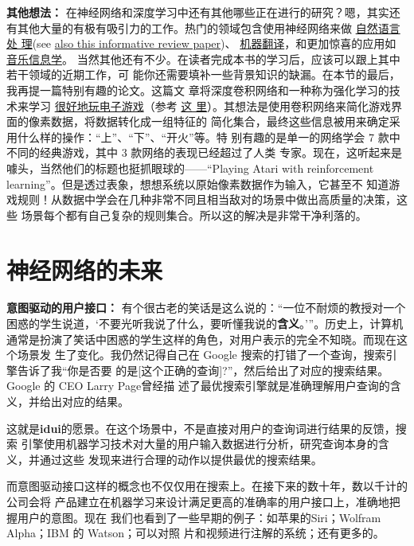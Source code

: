 \textbf{其他想法：} 在神经网络和深度学习中还有其他哪些正在进行的研究？嗯，其实还
有其他大量的有极有吸引力的工作。热门的领域包含使用神经网络来做%
\href{http://machinelearning.org/archive/icml2008/papers/391.pdf}{自然语言处
  理}(see \href{http://arxiv.org/abs/1103.0398}{also this informative review
  paper})、%
\href{http://papers.nips.cc/paper/5346-information-based-learning-by-agents-in-unbounded-state-spaces}{
  机器翻译}，和更加惊喜的应用如%
\href{http://yann.lecun.com/exdb/publis/pdf/humphrey-jiis-13.pdf}{音乐信息学}。
当然其他还有不少。在读者完成本书的学习后，应该可以跟上其中若干领域的近期工作，可
能你还需要填补一些背景知识的缺漏。在本节的最后，我再提一篇特别有趣的论文。这篇文
章将深度卷积网络和一种称为强化学习的技术来学习%
\href{http://www.cs.toronto.edu/~vmnih/docs/dqn.pdf}{很好地玩电子游戏}（参考
  \href{http://www.nature.com/nature/journal/v518/n7540/abs/nature14236.html}{这
    里}）。其想法是使用卷积网络来简化游戏界面的像素数据，将数据转化成一组特征的
简化集合，最终这些信息被用来确定采用什么样的操作：“上”、“下”、“开火”等。特
别有趣的是单一的网络学会 7 款中不同的经典游戏，其中 3 款网络的表现已经超过了人类
专家。现在，这听起来是噱头，当然他们的标题也挺抓眼球的——“Playing Atari with
reinforcement learning”。但是透过表象，想想系统以原始像素数据作为输入，它甚至不
知道游戏规则！从数据中学会在几种非常不同且相当敌对的场景中做出高质量的决策，这些
场景每个都有自己复杂的规则集合。所以这的解决是非常干净利落的。

\section{神经网络的未来}
\label{sec:on_the_future_of_neural_networks}

\textbf{意图驱动的用户接口：} 有个很古老的笑话是这么说的：“一位不耐烦的教授对一个
困惑的学生说道，‘不要光听我说了什么，要听懂我说的\textbf{含义}。’”。历史上，计算机
通常是扮演了笑话中困惑的学生这样的角色，对用户表示的完全不知晓。而现在这个场景发
生了变化。我仍然记得自己在 Google 搜索的打错了一个查询，搜索引擎告诉了我“你是否要
的是[这个正确的查询]?”，然后给出了对应的搜索结果。Google 的 CEO Larry Page曾经描
述了最优搜索引擎就是准确理解用户查询的含义，并给出对应的结果。

这就是\textbf{\gls{idui}}的愿景。在这个场景中，不是直接对用户的查询词进行结果的反馈，搜索
引擎使用机器学习技术对大量的用户输入数据进行分析，研究查询本身的含义，并通过这些
发现来进行合理的动作以提供最优的搜索结果。

而意图驱动接口这样的概念也不仅仅用在搜索上。在接下来的数十年，数以千计的公司会将
产品建立在机器学习来设计满足更高的准确率的用户接口上，准确地把握用户的意图。现在
我们也看到了一些早期的例子：如苹果的Siri；Wolfram Alpha；IBM 的 Watson；可以对照
片和视频进行注解的系统；还有更多的。

